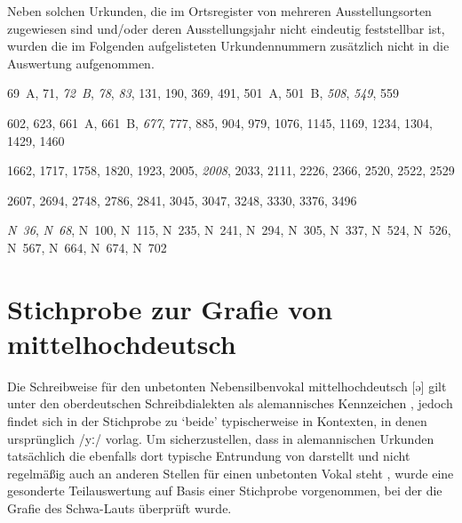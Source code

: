Neben solchen Urkunden, die im Ortsregister von \citet{cao-online} mehreren
Ausstellungsorten zugewiesen sind und/oder deren Ausstellungsjahr nicht
eindeutig feststellbar ist, wurden die im Folgenden
aufgelisteten Urkundennummern zusätzlich nicht in die Auswertung aufgenommen.

{%
\setlength{\columnsep}{35pt} %
\raggedright
\begin{multicols}{2}
\begin{description}[
	font=\normalfont,
	labelsep=\fontdimen2\font,
	leftmargin=1.4cm, %
]
\item[\cite{cao1},] 69~A, 71, \emph{72~B}, \emph{78}, \emph{83}, 131, 190, 369,
491, 501~A, 501~B, \emph{508}, \emph{549}, 559

\item[\cite{cao2},] 602, 623, 661~A, 661~B, \emph{677}, 777, 885, 904, 979,
1076, 1145, 1169, 1234, 1304, 1429, 1460

\item[\cite{cao3},] 1662, 1717, 1758, 1820, 1923, 2005, \emph{2008}, 2033, 2111,
2226, 2366, 2520, 2522, 2529

\item[\cite{cao4},] 2607, 2694, 2748, 2786, 2841, 3045, 3047, 3248, 3330, 3376,
3496

\item[\cite{cao5},] \emph{N~36}, \emph{N~68}, N~100, N~115, N~235, N~241, N~294,
N~305, N~337, N~524, N~526, N~567, N~664, N~674, N~702
\end{description}
\end{multicols}
}



\chapter{Stichprobe zur Grafie von mittelhochdeutsch }
\label{sec:caoalemschwa}

Die Schreibweise  für den unbetonten Nebensilbenvokal
mittelhochdeutsch  [ə] gilt unter den
ober\-deutschen Schreibdialekten als
alemannisches Kennzeichen
\autocites[vgl.][25]{weinhold1863}[75]{weinhold1883}[41, 113]{paul2007}, jedoch
findet sich  in der Stichprobe zu  `beide' typischerweise
in Kontexten, in denen ursprünglich  /yː/ vorlag. Um sicherzustellen,
dass  in alemannischen Urkunden tatsächlich die ebenfalls dort typische
Entrundung von  darstellt und nicht regelmäßig auch an anderen
Stellen für einen unbetonten Vokal steht \autocites%
	[466--467]{schirmunski1962}%
	[41]{paul2007}%
	[305]{ksw2}%
	[vgl.~auch][131--132]{boesch1946}%
, wurde eine gesonderte Teilauswertung auf Basis einer Stichprobe vorgenommen,
bei der die Grafie des Schwa-Lauts überprüft wurde.

